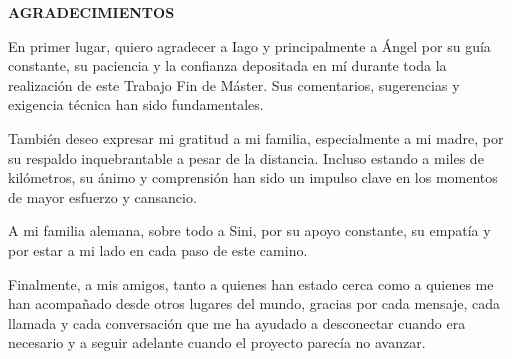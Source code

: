 \begin{center}
{\Large \bfseries AGRADECIMIENTOS}
\vspace{2.5cm}
\end{center}

En primer lugar, quiero agradecer a Iago y principalmente a Ángel por su guía constante, su paciencia y la confianza depositada en mí durante toda la realización de este Trabajo Fin de Máster. Sus comentarios, sugerencias y exigencia técnica han sido fundamentales.

También deseo expresar mi gratitud a mi familia, especialmente a mi madre, por su respaldo inquebrantable a pesar de la distancia. Incluso estando a miles de kilómetros, su ánimo y comprensión han sido un impulso clave en los momentos de mayor esfuerzo y cansancio.

A mi familia alemana, sobre todo a Sini, por su apoyo constante, su empatía y por estar a mi lado en cada paso de este camino.

Finalmente, a mis amigos, tanto a quienes han estado cerca como a quienes me han acompañado desde otros lugares del mundo, gracias por cada mensaje, cada llamada y cada conversación que me ha ayudado a desconectar cuando era necesario y a seguir adelante cuando el proyecto parecía no avanzar.